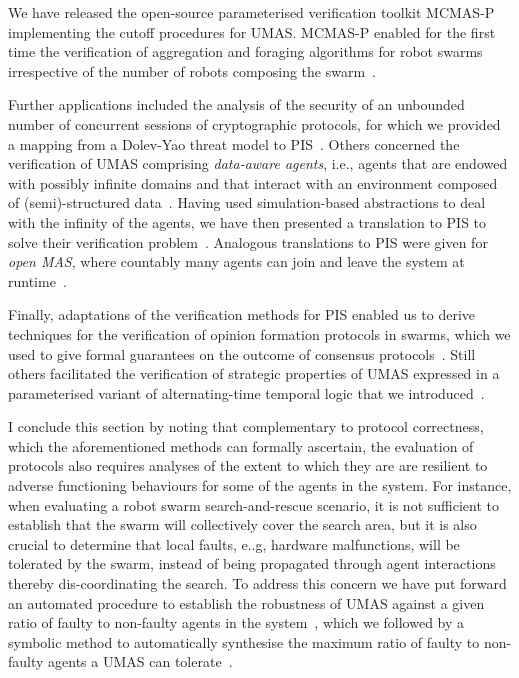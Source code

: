 \documentclass{article}
\newcommand{\mcmasp}{\textsc{MCMAS-P}\xspace}
\begin{document}
We have released the open-source parameterised verification toolkit \mcmasp
implementing the cutoff procedures for UMAS.  \mcmasp enabled for the first time
the verification of aggregation and foraging algorithms for robot swarms
irrespective of the number of robots composing the
swarm~\cite{KouvarosLomuscio15b,KouvarosLomuscio16a}.  

Further applications included the analysis of the security of an unbounded
number of concurrent sessions of cryptographic protocols, for which we provided
a mapping from a Dolev-Yao threat model to
PIS~\cite{BoureanuKouvarosLomuscio16}.   
Others concerned  the verification of UMAS comprising {\em data-aware agents},
i.e., agents that are endowed with possibly infinite domains and that interact
with an environment composed of (semi)-structured
data~\cite{MontaliCalvaneseGiacomo14}.  Having used simulation-based
abstractions to deal with the infinity of the  agents, we have then presented  a
translation  to PIS to solve their verification
problem~\cite{BelardinelliKouvarosLomuscio17}. Analogous translations to PIS were 
 given for {\em open MAS},  where countably many agents can join and
leave the system at runtime~\cite{Kouvaros+19}.


Finally,  adaptations of the verification methods for PIS  enabled us to derive
techniques for the verification of opinion formation protocols in swarms, which
we used to give formal guarantees on the outcome of consensus
protocols~\cite{KouvarosLomuscio16b}. Still others facilitated the
verification of strategic properties of UMAS expressed in a parameterised
variant  of alternating-time temporal logic that we
introduced~\cite{KouvarosLomuscio16c}.

I conclude this section by noting that complementary to protocol correctness,
which the aforementioned  methods can formally ascertain, the evaluation
of protocols also requires   analyses of the extent to which they are are
resilient to adverse functioning behaviours for some of the agents in the
system.  For instance, when evaluating a robot swarm search-and-rescue scenario,
it is not sufficient to establish that the swarm will collectively cover the
search area, but it is also crucial to determine that local faults, e..g,
hardware malfunctions, will be tolerated by the swarm, instead of being
propagated through agent interactions thereby dis-coordinating the search. To
address this concern we have put forward an automated procedure to establish the
robustness of UMAS against a given ratio of faulty to non-faulty agents in the
system~\cite{KouvarosLomuscio17b}, which we followed by a symbolic method to
automatically synthesise the maximum ratio of faulty to non-faulty agents a UMAS
can tolerate~\cite{KouvarosLomuscioPirovano18}.  
\end{document}
